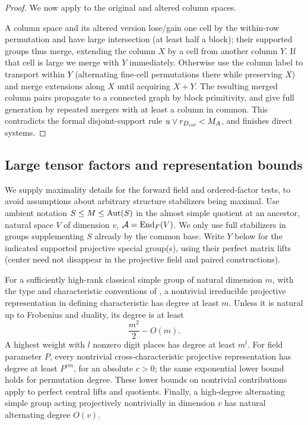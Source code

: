 \begin{proof}
We now apply  to the original and altered column spaces.

A column space and its altered version lose/gain one cell by the within-row permutation and have large
intersection (at least half a block); their supported groups thus merge, extending the column \(X\) by a
cell from another column \(Y\). If that cell is large we merge with \(Y\) immediately. Otherwise use the
column label to transport within \(Y\) (alternating fine-cell permutations there while preserving \(X\))
and merge extensions along \(X\) until acquiring \(X+Y\). The resulting merged column pairs propagate to
a connected graph by block primitivity, and give full generation by repeated mergers with at least a
column in common. This contradicts the formal disjoint-support rule \(u\vee r_{D_{\rm col}}<M_A\), and
finishes direct systems.

\end{proof}

\subsection{Large tensor factors and representation bounds}
\label{fa:overgroups}

We supply maximality details for the forward field and ordered-factor tests, to avoid assumptions about
arbitrary structure stabilizers being maximal. Use ambient notation \(S\le M\le{\rm Aut}(S)\) in the
almost simple quotient at an ancestor, natural space \(V\) of dimension \(v\), \(\mathcal A={\rm
End}_F(V)\). We only use full stabilizers in groups supplementing \(S\) already by the common base. Write
\(Y\) below for the indicated supported projective special group(s), using their perfect matrix lifts
(center need not disappear in the projective field and paired constructions).

\begin{lemma}\label{fa:degree-gap}
For a sufficiently high-rank classical simple group of natural dimension \(m\), with the type and
characteristic conventions of , a nontrivial irreducible
projective representation in defining characteristic has degree at least \(m\).  Unless it is natural up
to Frobenius and duality, its degree is at least
\[
 \frac{m^2}{2}-O(m).
\]
A highest weight with \(l\) nonzero digit places has degree at least \(m^l\).  For field parameter \(P\),
every nontrivial cross-characteristic projective representation has degree at least \(P^{cm}\), for an
absolute \(c>0\); the same exponential lower bound holds for permutation degree.  These lower bounds on
nontrivial contributions apply to perfect central lifts and quotients.  Finally, a high-degree
alternating simple group acting projectively nontrivially in dimension \(v\) has natural alternating
degree \(O(v)\).
\end{lemma}

